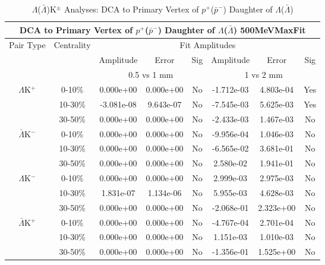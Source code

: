 \documentclass[../AnalysisNoteJBuxton.tex]{subfiles}
\begin{document}
\begin{table}
 \centering
 \begin{tabular}{|c|c|c|c|c||c|c|c|}
  \multicolumn{8}{c}{DCA to Primary Vertex of $p^{+}$($\bar{p}^{-}$) Daughter of $\Lambda$($\bar{\Lambda}$) 500MeVMaxFit} \\
  \hline
  \multirow{3}{*}{Pair Type} & \multirow{3}{*}{Centrality} & \multicolumn{6}{c|}{Fit Amplitudes} \\
  \cline{3-8}
   & & Amplitude & Error & Sig & Amplitude & Error & Sig \\  
  \cline{3-8}
   & & \multicolumn{3}{c||}{0.5 vs 1 mm} & \multicolumn{3}{c|}{1 vs 2 mm} \\  
  \hline
  \multirow{3}{*}{$\Lambda$K$^{+}$}
   &  0-10\% & 0.000e+00 & 0.000e+00 & No & -1.712e-03 & 4.803e-04 & Yes \\
   & 10-30\% & -3.081e-08 & 9.643e-07 & No & -7.545e-03 & 5.625e-03 & Yes \\
   & 30-50\% & 0.000e+00 & 0.000e+00 & No & -2.433e-03 & 1.467e-03 & No \\
  \hline
  \multirow{3}{*}{$\bar{\Lambda}$K$^{-}$}
   &  0-10\% & 0.000e+00 & 0.000e+00 & No & -9.956e-04 & 1.046e-03 & No \\
   & 10-30\% & 0.000e+00 & 0.000e+00 & No & -6.565e-02 & 3.681e-01 & No \\
   & 30-50\% & 0.000e+00 & 0.000e+00 & No & 2.580e-02 & 1.941e-01 & No \\
  \hline \hline
  \multirow{3}{*}{$\Lambda$K$^{-}$}
   &  0-10\% & 0.000e+00 & 0.000e+00 & No & 2.999e-03 & 2.975e-03 & No \\
   & 10-30\% & 1.831e-07 & 1.134e-06 & No & 5.955e-03 & 4.628e-03 & No \\
   & 30-50\% & 0.000e+00 & 0.000e+00 & No & -2.068e-01 & 2.323e+00 & No \\
  \hline
  \multirow{3}{*}{$\bar{\Lambda}$K$^{+}$}
   &  0-10\% & 0.000e+00 & 0.000e+00 & No & -4.767e-04 & 2.701e-04 & No \\
   & 10-30\% & 0.000e+00 & 0.000e+00 & No & 1.151e-03 & 1.010e-03 & No \\
   & 30-50\% & 0.000e+00 & 0.000e+00 & No & -1.356e-01 & 1.525e+00 & No \\
  \hline
 \end{tabular}
 \caption{$\Lambda$($\bar{\Lambda}$)K$^{\pm}$ Analyses: DCA to Primary Vertex of $p^{+}$($\bar{p}^{-}$) Daughter of $\Lambda$($\bar{\Lambda}$)}
 \label{tab:DcaToPrimVertexProtonDaughtOfLamLamKch_500MeVMaxFit}
\end{table}
\end{document}
